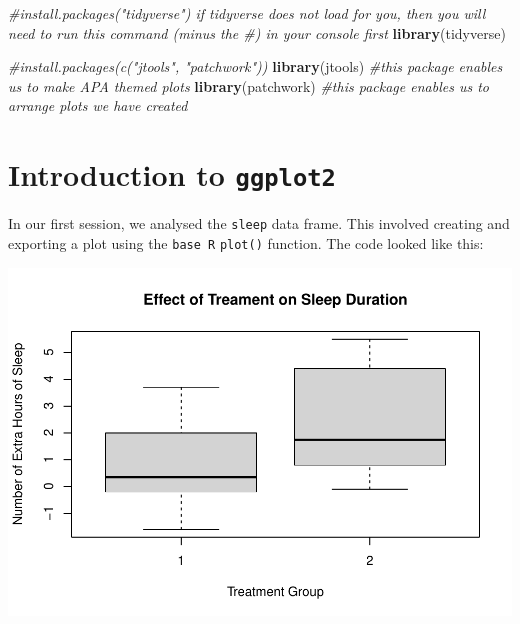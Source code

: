 \documentclass[
]{book}
\newenvironment{Shaded}{\begin{snugshade}}{\end{snugshade}}
\newcommand{\AttributeTok}[1]{\textcolor[rgb]{0.13,0.29,0.53}{#1}}
\newcommand{\CommentTok}[1]{\textcolor[rgb]{0.56,0.35,0.01}{\textit{#1}}}
\newcommand{\FunctionTok}[1]{\textcolor[rgb]{0.13,0.29,0.53}{\textbf{#1}}}
\newcommand{\NormalTok}[1]{#1}
\newcommand{\SpecialCharTok}[1]{\textcolor[rgb]{0.81,0.36,0.00}{\textbf{#1}}}
\newcommand{\StringTok}[1]{\textcolor[rgb]{0.31,0.60,0.02}{#1}}
\begin{document}
\begin{Shaded}
\begin{Highlighting}[]
\CommentTok{\#install.packages("tidyverse") if tidyverse does not load for you, then you will need to run this command (minus the \#) in your console first}
\FunctionTok{library}\NormalTok{(tidyverse)}

\CommentTok{\#install.packages(c("jtools", "patchwork")) }
\FunctionTok{library}\NormalTok{(jtools) }\CommentTok{\#this package enables us to make APA themed plots}
\FunctionTok{library}\NormalTok{(patchwork) }\CommentTok{\#this package enables us to arrange plots we have created}
\end{Highlighting}
\end{Shaded}

\hypertarget{introduction-to-ggplot2}{%
\section{\texorpdfstring{Introduction to \texttt{ggplot2}}{Introduction to ggplot2}}\label{introduction-to-ggplot2}}

In our first session, we analysed the \texttt{sleep} data frame. This involved creating and exporting a plot using the \texttt{base\ R} \texttt{plot()} function. The code looked like this:

\begin{Shaded}
\end{Shaded}

\includegraphics{rintro_demo_files/figure-latex/unnamed-chunk-275-1.pdf}
\end{document}

